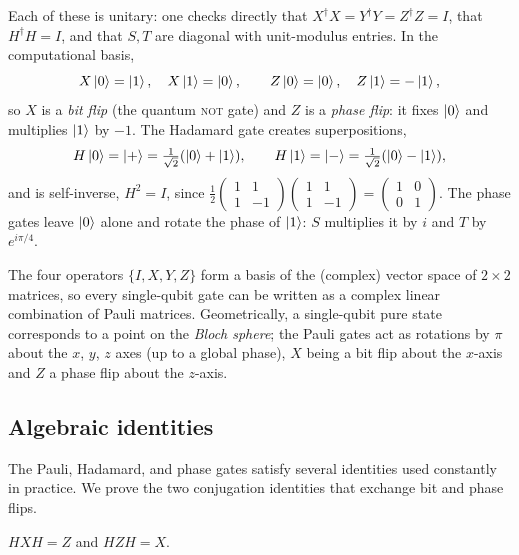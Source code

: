 Each of these is unitary: one checks directly that $X^{\dagger}X=Y^{\dagger}Y
=Z^{\dagger}Z=I$, that $H^{\dagger}H=I$, and that $S,T$ are diagonal with
unit-modulus entries. In the computational basis,
\[
  X\ket{0}=\ket{1},\quad X\ket{1}=\ket{0},\qquad
  Z\ket{0}=\ket{0},\quad Z\ket{1}=-\ket{1},
\]
so $X$ is a \emph{bit flip} (the quantum \textsc{not} gate) and $Z$ is a
\emph{phase flip}: it fixes $\ket{0}$ and multiplies $\ket{1}$ by $-1$. The
Hadamard gate creates superpositions,
\[
  H\ket{0}=\ket{+}=\tfrac{1}{\sqrt{2}}(\ket{0}+\ket{1}),\qquad
  H\ket{1}=\ket{-}=\tfrac{1}{\sqrt{2}}(\ket{0}-\ket{1}),
\]
and is self-inverse, $H^{2}=I$, since
$\tfrac12\left(\begin{smallmatrix}1&1\\1&-1\end{smallmatrix}\right)
\left(\begin{smallmatrix}1&1\\1&-1\end{smallmatrix}\right)
=\left(\begin{smallmatrix}1&0\\0&1\end{smallmatrix}\right)$. The phase gates
leave $\ket{0}$ alone and rotate the phase of $\ket{1}$: $S$ multiplies it by
$i$ and $T$ by $e^{i\pi/4}$.

The four operators $\{I,X,Y,Z\}$ form a basis of the (complex) vector space of
$2\times2$ matrices, so every single-qubit gate can be written as a complex
linear combination of Pauli matrices. Geometrically, a single-qubit pure state
corresponds to a point on the \emph{Bloch sphere}; the Pauli gates act as
rotations by $\pi$ about the $x$, $y$, $z$ axes (up to a global phase), $X$ being
a bit flip about the $x$-axis and $Z$ a phase flip about the $z$-axis.

\subsection{Algebraic identities}

The Pauli, Hadamard, and phase gates satisfy several identities used constantly
in practice. We prove the two conjugation identities that exchange bit and phase
flips.

\begin{lemma}
\label{l2:lem:conj}
$H X H = Z$ and $H Z H = X$.
\end{lemma}

